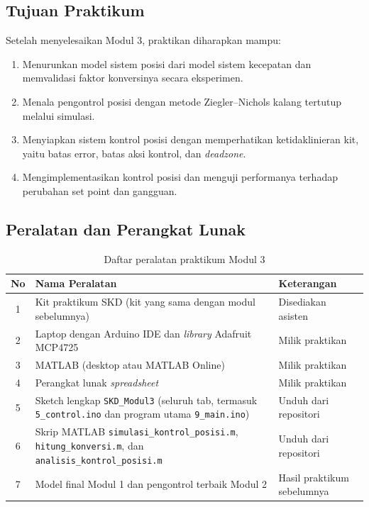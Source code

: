 \documentclass[11pt,a4paper]{article}
\newcommand{\prog}[1]{\texttt{#1}}
\begin{document}
\subsection{Tujuan Praktikum}
Setelah menyelesaikan Modul 3, praktikan diharapkan mampu:
\begin{enumerate}
\item Menurunkan model sistem posisi dari model sistem kecepatan dan memvalidasi faktor konversinya secara eksperimen.
\item Menala pengontrol posisi dengan metode Ziegler--Nichols kalang tertutup melalui simulasi.
\item Menyiapkan sistem kontrol posisi dengan memperhatikan ketidaklinieran kit, yaitu batas error, batas aksi kontrol, dan \textit{deadzone}.
\item Mengimplementasikan kontrol posisi dan menguji performanya terhadap perubahan set point dan gangguan.
\end{enumerate}

\subsection{Peralatan dan Perangkat Lunak}
\begin{table}[H]
\centering
\caption{Daftar peralatan praktikum Modul 3}
\label{tab:peralatan}
\begin{tabularx}{\textwidth}{|c|X|l|}
\hline
\textbf{No} & \textbf{Nama Peralatan} & \textbf{Keterangan} \\
\hline
1 & Kit praktikum SKD (kit yang sama dengan modul sebelumnya) & Disediakan asisten \\
2 & Laptop dengan Arduino IDE dan \textit{library} Adafruit MCP4725 & Milik praktikan \\
3 & MATLAB (desktop atau MATLAB Online) & Milik praktikan \\
4 & Perangkat lunak \textit{spreadsheet} & Milik praktikan \\
5 & Sketch lengkap \prog{SKD\_Modul3} (seluruh tab, termasuk \prog{5\_control.ino} dan program utama \prog{9\_main.ino}) & Unduh dari repositori \\
6 & Skrip MATLAB \prog{simulasi\_kontrol\_posisi.m}, \prog{hitung\_konversi.m}, dan \prog{analisis\_kontrol\_posisi.m} & Unduh dari repositori \\
7 & Model final Modul 1 dan pengontrol terbaik Modul 2 & Hasil praktikum sebelumnya \\
\hline
\end{tabularx}
\end{table}
\end{document}
